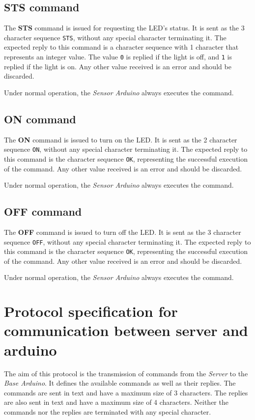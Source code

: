 \documentclass[conference, a4paper]{IEEEtran}
\begin{document}
\subsection{STS command}

The \textbf{STS} command is issued for requesting the LED's status. It is sent as the 3 character sequence \texttt{STS}, without any special character terminating it. The expected reply to this command is a character sequence with 1 character that represents an integer value. The value \texttt{0} is replied if the light is off, and \texttt{1} is replied if the light is on. Any other value received is an error and should be discarded.

Under normal operation, the \textit{Sensor Arduino} always executes the command.

\subsection{ON command}

The \textbf{ON} command is issued to turn on the LED. It is sent as the 2 character sequence \texttt{ON}, without any special character terminating it. The expected reply to this command is the character sequence \texttt{OK}, representing the successful execution of the command. Any other value received is an error and should be discarded.

Under normal operation, the \textit{Sensor Arduino} always executes the command.

\subsection{OFF command}

The \textbf{OFF} command is issued to turn off the LED. It is sent as the 3 character sequence \texttt{OFF}, without any special character terminating it. The expected reply to this command is the character sequence \texttt{OK}, representing the successful execution of the command. Any other value received is an error and should be discarded.

Under normal operation, the \textit{Sensor Arduino} always executes the command.

\section{Protocol specification for communication between server and arduino}
\label{prot_serv}

The aim of this protocol is the transmission of commands from the \textit{Server} to the \textit{Base Arduino}. It defines the available commands as well as their replies. The commands are sent in text and have a maximum size of 3 characters. The replies are also sent in text and have a maximum size of 4 characters. Neither the commands nor the replies are terminated with any special character.
\end{document}
